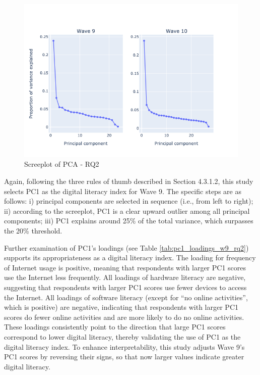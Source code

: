 \begin{figure}
    \centering
    \caption{Screeplot of PCA - RQ2}
    \label{fig:screeplot_rq2}
    \includegraphics[width=\textwidth]{figures/pca_screeplot_q2.png}
\end{figure}

Again, following the three rules of thumb described in Section 4.3.1.2, this study selects PC1 as the digital literacy index for Wave 9. The specific steps are as follows: i) principal components are selected in sequence (i.e., from left to right); ii) according to the screeplot, PC1 is a clear upward outlier among all principal components; iii) PC1 explains around 25\% of the total variance, which surpasses the 20\% threshold. 

Further examination of PC1's loadings (see Table \ref{tab:pc1_loadings_w9_rq2}) supports its appropriateness as a digital literacy index. The loading for frequency of Internet usage is positive, meaning that respondents with larger PC1 scores use the Internet less frequently. All loadings of hardware literacy are negative, suggesting that respondents with larger PC1 scores use fewer devices to access the Internet. All loadings of software literacy (except for ``no online activities”, which is positive) are negative, indicating that respondents with larger PC1 scores do fewer online activities and are more likely to do no online activities. These loadings consistently point to the direction that large PC1 scores correspond to lower digital literacy, thereby validating the use of PC1 as the digital literacy index. To enhance interpretability, this study adjusts Wave 9's PC1 scores by reversing their signs, so that now larger values indicate greater digital literacy.

